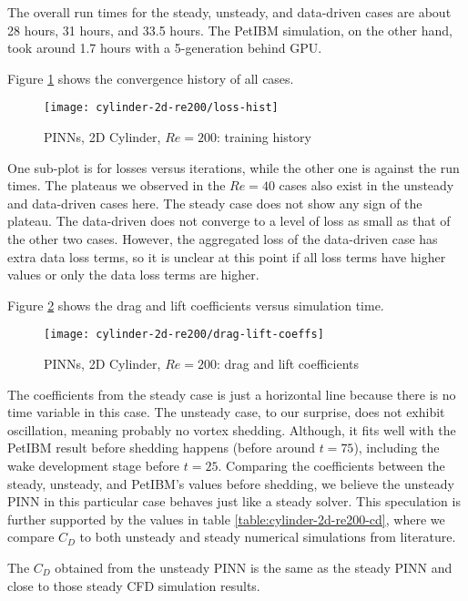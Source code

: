 The overall run times for the steady, unsteady, and data-driven cases are about 28 hours, 31 hours, and 33.5 hours.
The PetIBM simulation, on the other hand, took around 1.7 hours with a 5-generation behind GPU.

Figure \ref{fig:cylinder-re200-train-hist} shows the convergence history of all cases.
\begin{figure}[hbt!]
    \texttt{[image: cylinder-2d-re200/loss-hist]}
    \caption{PINNs, 2D Cylinder, $Re=200$: training history}
    \label{fig:cylinder-re200-train-hist}
\end{figure}
One sub-plot is for losses versus iterations, while the other one is against the run times.
The plateaus we observed in the $Re=40$ cases also exist in the unsteady and data-driven cases here.
The steady case does not show any sign of the plateau.
The data-driven does not converge to a level of loss as small as that of the other two cases.
However, the aggregated loss of the data-driven case has extra data loss terms, so it is unclear at this point if all loss terms have higher values or only the data loss terms are higher. 

Figure \ref{fig:cylinder-re200-drag-lift} shows the drag and lift coefficients versus simulation time.
\begin{figure}[hbt!]
    \texttt{[image: cylinder-2d-re200/drag-lift-coeffs]}
    \caption{PINNs, 2D Cylinder, $Re=200$: drag and lift coefficients}
    \label{fig:cylinder-re200-drag-lift}
\end{figure}
The coefficients from the steady case is just a horizontal line because there is no time variable in this case.
The unsteady case, to our surprise, does not exhibit oscillation, meaning probably no vortex shedding.
Although, it fits well with the PetIBM result before shedding happens (before around $t=75$), including the wake development stage before $t=25$.
Comparing the coefficients between the steady, unsteady, and PetIBM's values before shedding, we believe the unsteady PINN in this particular case behaves just like a steady solver.
This speculation is further supported by the values in table \ref{table:cylinder-2d-re200-cd}, where we compare $C_D$ to both unsteady and steady numerical simulations from literature.

The $C_D$ obtained from the unsteady PINN is the same as the steady PINN and close to those steady CFD simulation results.

